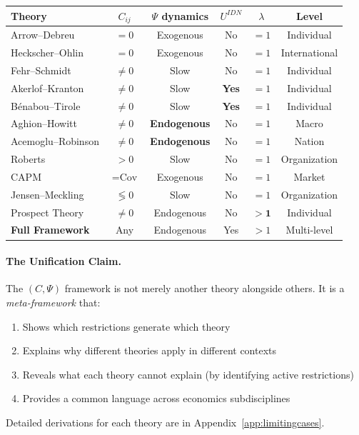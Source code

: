 \begin{center}
\renewcommand{\arraystretch}{1.2}
\small
\begin{tabular}{lccccc}
\hline
\textbf{Theory} & $C_{ij}$ & $\Psi$ dynamics & $U^{IDN}$ & $\lambda$ & Level \\
\hline
Arrow--Debreu & $= 0$ & Exogenous & No & $= 1$ & Individual \\
Heckscher--Ohlin & $= 0$ & Exogenous & No & $= 1$ & International \\
Fehr--Schmidt & $\neq 0$ & Slow & No & $= 1$ & Individual \\
Akerlof--Kranton & $\neq 0$ & Slow & \textbf{Yes} & $= 1$ & Individual \\
Bénabou--Tirole & $\neq 0$ & Slow & \textbf{Yes} & $= 1$ & Individual \\
Aghion--Howitt & $\neq 0$ & \textbf{Endogenous} & No & $= 1$ & Macro \\
Acemoglu--Robinson & $\neq 0$ & \textbf{Endogenous} & No & $= 1$ & Nation \\
Roberts & $> 0$ & Slow & No & $= 1$ & Organization \\
CAPM & $= \text{Cov}$ & Exogenous & No & $= 1$ & Market \\
Jensen--Meckling & $\lessgtr 0$ & Slow & No & $= 1$ & Organization \\
Prospect Theory & $\neq 0$ & Endogenous & No & $\mathbf{> 1}$ & Individual \\
\hline
\textbf{Full Framework} & Any & Endogenous & Yes & $> 1$ & Multi-level \\
\hline
\end{tabular}
\end{center}

\paragraph{The Unification Claim.}
The $(C, \Psi)$ framework is not merely another theory alongside others.
It is a \emph{meta-framework} that:
\begin{enumerate}
  \item Shows which restrictions generate which theory
  \item Explains why different theories apply in different contexts
  \item Reveals what each theory cannot explain (by identifying active restrictions)
  \item Provides a common language across economics subdisciplines
\end{enumerate}

Detailed derivations for each theory are in Appendix~\ref{app:limitingcases}.

